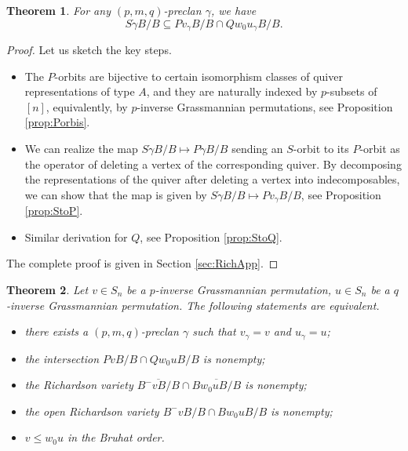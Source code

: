 \documentclass[12pt,reqno]{amsart}
\numberwithin{equation}{section}
\newtheorem{theorem}{Theorem}[section]
\theoremstyle{definition}
\begin{document}
\begin{theorem}\label{thm:gammainPQorb}
For any $(p,m,q)$-preclan $\gamma$, we have 
\begin{equation}
S\dot{\gamma}B/B\subseteq Pv_\gamma B/B\cap Qw_0u_\gamma B/B.
\end{equation}
\end{theorem}
\begin{proof}Let us sketch the key steps.
\begin{itemize}
    \item The $P$-orbits are bijective to certain isomorphism classes of quiver representations of type $A$, and they are naturally indexed by $p$-subsets of $[n]$, equivalently, by $p$-inverse Grassmannian permutations, see Proposition \ref{prop:Porbis}.
    
\item We can realize the map  $S\dot{\gamma}B/B\mapsto P\dot{\gamma} B/B$ sending an $S$-orbit to its $P$-orbit as the operator of deleting a vertex of the corresponding quiver. By decomposing the representations of the quiver after deleting a vertex into indecomposables, we can show that the map is given by $S\dot{\gamma}B/B\mapsto Pv_\gamma B/B$, see Proposition \ref{prop:StoP}.

    \item Similar derivation  for $Q$, see Proposition \ref{prop:StoQ}. 
\end{itemize}
The complete proof is given in Section \ref{sec:RichApp}. 
\end{proof}





\begin{theorem}\label{thm:equivuandv}
Let $v\in S_n$ be a $p$-inverse Grassmannian permutation, $u\in S_n$ be a $q$-inverse Grassmannian permutation. 
The following statements are equivalent. 
\begin{itemize}
    \item[(1)] there exists a $(p,m,q)$-preclan $\gamma$ such that $v_\gamma=v$ and $u_\gamma=u$; 
    \item[(2)] the intersection $PvB/B\cap Qw_0uB/B$ is nonempty; 
    \item[(3)] the Richardson variety $\overline{B^-vB/B}\cap \overline{Bw_0uB/B}$ is nonempty; 
    \item[(4)] the open Richardson variety $B^-vB/B\cap Bw_0uB/B$ is nonempty; 
    \item[(5)] $v\leq w_0u$ in the Bruhat order. 
\end{itemize}
\end{theorem}
\end{document}

